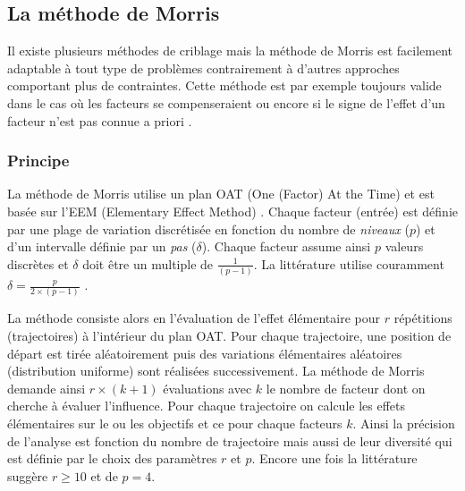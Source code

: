 \subsection{La méthode de Morris} %
\label{sub:la_methode_de_morris}

Il existe plusieurs méthodes de criblage mais la méthode de Morris \parencite{Morris1991161}
est facilement adaptable à tout type de problèmes contrairement à d’autres approches
comportant plus de contraintes. Cette méthode est par exemple toujours valide dans le cas où
les facteurs se compenseraient ou encore si le signe de l’effet d’un facteur n’est pas
connue a priori \parencite{Saltelli2004}.


\subsubsection{Principe} %
\label{ssub:principe}
La méthode de Morris utilise un plan OAT (One (Factor) At the Time) et est basée sur
l’EEM (Elementary Effect Method) \parencite{Saltelli2004}.
Chaque facteur (entrée) est définie par une plage de variation discrétisée en fonction
du nombre de \emph{niveaux} ($p$) et d’un intervalle définie par un \emph{pas} ($\delta$).
Chaque facteur assume ainsi $p$ valeurs discrètes et $\delta$ doit être un multiple de
$\frac{1}{(p - 1)}$. La littérature utilise couramment $\delta = \frac{p}{2 \times (p - 1)}$
\parencite{Morris1991161, Campolongo20071509}.

La méthode consiste alors en l’évaluation de l’effet élémentaire pour $r$ répétitions
(trajectoires) à l’intérieur du plan OAT. Pour chaque trajectoire, une position de départ
est tirée aléatoirement puis des variations élémentaires aléatoires (distribution uniforme)
sont réalisées successivement. La méthode de Morris demande ainsi $r \times (k + 1)$ évaluations
avec $k$ le nombre de facteur dont on cherche à évaluer l’influence. Pour chaque trajectoire
on calcule les effets élémentaires sur le ou les objectifs et ce pour chaque facteurs $k$.
Ainsi la précision de l’analyse est fonction du nombre de trajectoire mais aussi
de leur diversité qui est définie par le choix des paramètres $r$ et $p$.
Encore une fois la littérature suggère $r \geq 10$ et de $p = 4$.



